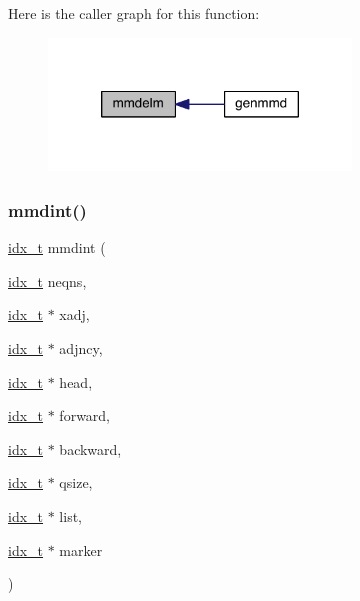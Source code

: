 Here is the caller graph for this function\+:\nopagebreak
\begin{figure}[H]
\begin{center}
\leavevmode
\includegraphics[width=228pt]{a00248_a6425fb0927ca94b9d4064e04071a44be_icgraph}
\end{center}
\end{figure}
\mbox{\label{a00248_a58b398d038ac45f0c1ade19344820fcb}} 
\subsubsection{\texorpdfstring{mmdint()}{mmdint()}}
{\footnotesize\ttfamily \hyperlink{a00876_aaa5262be3e700770163401acb0150f52}{idx\+\_\+t} mmdint (\begin{DoxyParamCaption}\item[{\hyperlink{a00876_aaa5262be3e700770163401acb0150f52}{idx\+\_\+t}}]{neqns,  }\item[{\hyperlink{a00876_aaa5262be3e700770163401acb0150f52}{idx\+\_\+t} $\ast$}]{xadj,  }\item[{\hyperlink{a00876_aaa5262be3e700770163401acb0150f52}{idx\+\_\+t} $\ast$}]{adjncy,  }\item[{\hyperlink{a00876_aaa5262be3e700770163401acb0150f52}{idx\+\_\+t} $\ast$}]{head,  }\item[{\hyperlink{a00876_aaa5262be3e700770163401acb0150f52}{idx\+\_\+t} $\ast$}]{forward,  }\item[{\hyperlink{a00876_aaa5262be3e700770163401acb0150f52}{idx\+\_\+t} $\ast$}]{backward,  }\item[{\hyperlink{a00876_aaa5262be3e700770163401acb0150f52}{idx\+\_\+t} $\ast$}]{qsize,  }\item[{\hyperlink{a00876_aaa5262be3e700770163401acb0150f52}{idx\+\_\+t} $\ast$}]{list,  }\item[{\hyperlink{a00876_aaa5262be3e700770163401acb0150f52}{idx\+\_\+t} $\ast$}]{marker }\end{DoxyParamCaption})}

